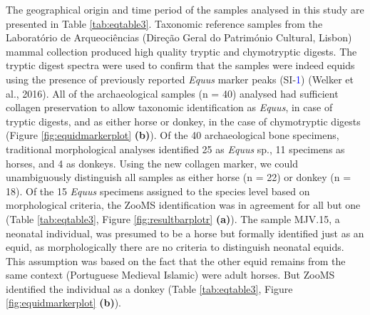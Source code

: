 \documentclass[preprint, 3p, authoryear]{elsarticle} %
\begin{document}
The geographical origin and time period of the samples analysed in this study are presented in Table \ref{tab:eqtable3}.
Taxonomic reference samples from the Laboratório de Arqueociências (Direção Geral do Património Cultural, Lisbon) mammal collection produced high quality tryptic and chymotryptic digests. The tryptic digest spectra were used to confirm that the samples were indeed equids using the presence of previously reported \emph{Equus} marker peaks (SI-\textcolor{blue}{1}) (Welker et al., 2016). All of the archaeological samples (n = 40) analysed had sufficient collagen preservation to allow taxonomic identification as \emph{Equus}, in case of tryptic digests, and as either horse or donkey, in the case of chymotryptic digests (Figure \ref{fig:equidmarkerplot} \textbf{(b)}). Of the 40 archaeological bone specimens, traditional morphological analyses identified 25 as \emph{Equus} sp., 11 specimens as horses, and 4 as donkeys. Using the new collagen marker, we could unambiguously distinguish all samples as either horse (n = 22) or donkey (n = 18). Of the 15 \emph{Equus} specimens assigned to the species level based on morphological criteria, the ZooMS identification was in agreement for all but one (Table \ref{tab:eqtable3}, Figure \ref{fig:resultbarplotr} \textbf{(a)}). The sample MJV.15, a neonatal individual, was presumed to be a horse but formally identified just as an equid, as morphologically there are no criteria to distinguish neonatal equids. This assumption was based on the fact that the other equid remains from the same context (Portuguese Medieval Islamic) were adult horses. But ZooMS identified the individual as a donkey (Table \ref{tab:eqtable3}, Figure \ref{fig:equidmarkerplot} \textbf{(b)}).
\end{document}

